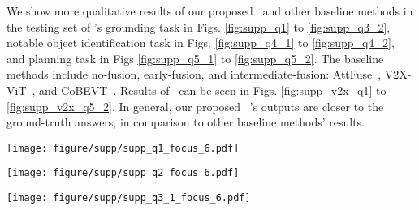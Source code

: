 We show more qualitative results of our proposed \namemethod~and other baseline methods in the testing set of \namedataset's grounding task in Figs. \ref{fig:supp_q1} to \ref{fig:supp_q3_2}, notable object identification task in Figs. \ref{fig:supp_q4_1} to \ref{fig:supp_q4_2}, and planning task in Figs \ref{fig:supp_q5_1} to \ref{fig:supp_q5_2}. The baseline methods include no-fusion, early-fusion, and intermediate-fusion: AttFuse~\cite{xu2022opencood}, V2X-ViT~\cite{xu2022v2xvit}, and CoBEVT~\cite{xu2022cobevt}.
Results of \namexsplit~can be seen in Figs. \ref{fig:supp_v2x_q1} to \ref{fig:supp_v2x_q5_2}.
In general, our proposed ~\namemethod's outputs are closer to the ground-truth answers, in comparison to other baseline methods' results.


\begin{figure*}[!t]
\centering
\texttt{[image: figure/supp/supp\_q1\_focus\_6.pdf]}
\caption[]
        {\namemethod~and baseline methods' \textit{grounding} results on \namedataset's \namevsplit~testing set.~\textcolor{magenta}{Magenta $\circ$}: reference locations in questions. \textcolor{olive}{Yellow $+$}: model output locations. \textcolor{Green}{Green $\circ$}: ground-truth answers.} 
        \label{fig:supp_q1}
        \vspace{-5pt}
\end{figure*}

\begin{figure*}[!t]
\centering
\texttt{[image: figure/supp/supp\_q2\_focus\_6.pdf]}
\caption[]
        {\namemethod~and baseline methods' \textit{grounding} results on \namedataset's \namevsplit~testing set.~\textcolor{magenta}{Magenta $\circ$}: reference locations in questions. \textcolor{olive}{Yellow $+$}: model output locations. \textcolor{Green}{Green $\circ$}: ground-truth answers.} 
        \label{fig:supp_q2}
        \vspace{-5pt}
\end{figure*}

\begin{figure*}[!t]
\centering
\texttt{[image: figure/supp/supp\_q3\_1\_focus\_6.pdf]}
\caption[]
        {\namemethod~and baseline methods' \textit{grounding} results on \namedataset's \namevsplit~testing set.~\textcolor{magenta}{Magenta $\circ$}: reference locations in questions. \textcolor{olive}{Yellow $+$}: model output locations. \textcolor{Green}{Green $\circ$}: ground-truth answers.} 
        \label{fig:supp_q3_1}
        \vspace{-5pt}
\end{figure*}

